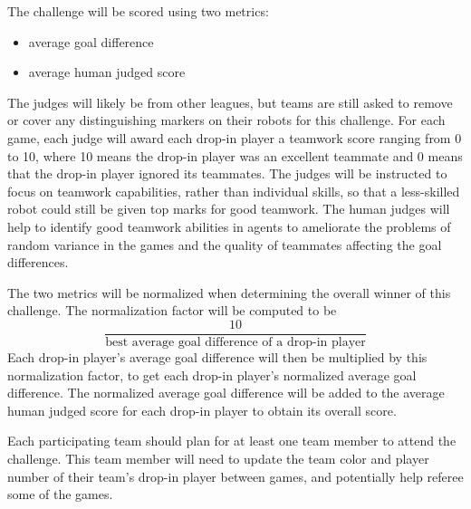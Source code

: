 \documentclass{article}
\begin{document}
The challenge will be scored using two metrics: 
\begin{itemize}
\item average goal difference
\item average human judged score
\end{itemize}

The judges will likely be from other leagues, but teams are still asked to remove or cover any distinguishing markers on their robots for this challenge.  For each game, each judge will award each drop-in player a teamwork score ranging from 0 to 10, where 10 means the drop-in player was an excellent teammate and 0 means that the drop-in player ignored its teammates.  The judges will be instructed to focus on teamwork capabilities, rather than individual skills, so that a less-skilled robot could still be given top marks for good teamwork.  The human judges will help to identify good teamwork abilities in agents to ameliorate the problems of random variance in the games and the quality of teammates affecting the goal differences.

The two metrics will be normalized when determining the overall winner of this challenge.  The normalization factor will be computed to be \[\frac{10}{\text{best average goal difference of a drop-in player}}\]
Each drop-in player's average goal difference will then be multiplied by this normalization factor, to get each drop-in player's normalized average goal difference.  The normalized average goal difference will be added to the average human judged score for each drop-in player to obtain its overall score.

Each participating team should plan for at least one team member to attend the challenge.  This team member will need to update the team color and player number of their team's drop-in player between games, and potentially help referee some of the games.
\end{document}
